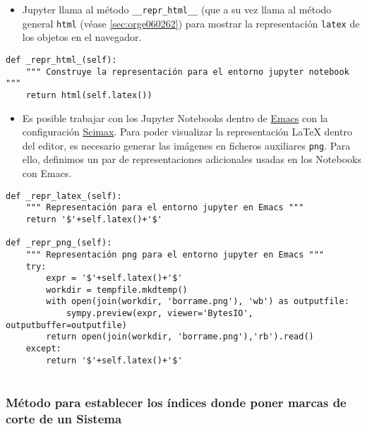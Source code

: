 \documentclass[11pt]{report}
\begin{document}
\begin{itemize}
\item Jupyter llama al método \texttt{\_\_repr\_html\_\_} (que a su vez llama al
método general \texttt{html} (véase \ref{sec:orge060262}) para mostrar la representación \texttt{latex} de los
objetos en el navegador.
\end{itemize}

\begin{verbatim}
def _repr_html_(self):
    """ Construye la representación para el entorno jupyter notebook """
    return html(self.latex())

\end{verbatim}

\begin{itemize}
\item Es posible trabajar con los Jupyter Notebooks dentro de \href{https://www.gnu.org/software/emacs/}{Emacs} con la
configuración \href{https://github.com/jkitchin/scimax}{Scimax}. Para poder visualizar la representación
\LaTeX{} dentro del editor, es necesario generar las imágenes en
ficheros auxiliares \texttt{png}. Para ello, definimos un par de
representaciones adicionales usadas en los Notebooks con Emacs.
\end{itemize}

\begin{verbatim}
def _repr_latex_(self):
    """ Representación para el entorno jupyter en Emacs """
    return '$'+self.latex()+'$'

def _repr_png_(self):
    """ Representación png para el entorno jupyter en Emacs """
    try:
        expr = '$'+self.latex()+'$'
        workdir = tempfile.mkdtemp()
        with open(join(workdir, 'borrame.png'), 'wb') as outputfile:
            sympy.preview(expr, viewer='BytesIO', outputbuffer=outputfile)
        return open(join(workdir, 'borrame.png'),'rb').read()
    except:
        return '$'+self.latex()+'$'
                                                               
\end{verbatim}

\subsubsection{Método para establecer los índices donde poner marcas de corte de un Sistema}
\label{sec:orgaa918a9}
\end{document}
